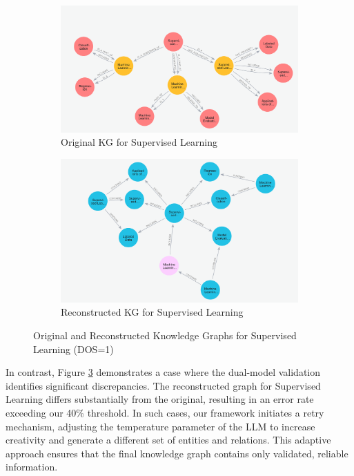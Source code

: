 \documentclass[11pt]{article}
\begin{document}
\begin{figure}[H]
    \centering
    \begin{subfigure}[b]{0.48\columnwidth}
        \centering
        \includegraphics[width=\textwidth]{img/original_dos1_Supervised_Learning.png}
        \caption{Original KG for Supervised Learning}
        \label{fig:dos1_sl_original}
    \end{subfigure}
    \hfill
    \begin{subfigure}[b]{0.48\columnwidth}
        \centering
        \includegraphics[width=\textwidth]{img/reconstructed_dos1_Supervised_Learning.png}
        \caption{Reconstructed KG for Supervised Learning}
        \label{fig:dos1_sl_reconstructed}
    \end{subfigure}
    \caption{Original and Reconstructed Knowledge Graphs for Supervised Learning (DOS=1)}
    \label{fig:comparison_dos1_sl}
\end{figure}

In contrast, Figure \ref{fig:comparison_dos1_sl} demonstrates a case where the dual-model validation identifies significant discrepancies. The reconstructed graph for Supervised Learning differs substantially from the original, resulting in an error rate exceeding our 40\% threshold. In such cases, our framework initiates a retry mechanism, adjusting the temperature parameter of the LLM to increase creativity and generate a different set of entities and relations. This adaptive approach ensures that the final knowledge graph contains only validated, reliable information.
\end{document}
